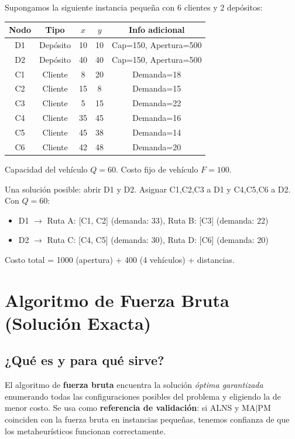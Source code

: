 \documentclass[12pt,a4paper]{article}
\begin{document}
\begin{ejemplo}
Supongamos la siguiente instancia pequeña con 6 clientes y 2 depósitos:

\begin{center}
\begin{tabular}{ccccc}
\toprule
Nodo & Tipo & $x$ & $y$ & Info adicional \\
\midrule
D1 & Depósito & 10 & 10 & Cap=150, Apertura=500 \\
D2 & Depósito & 40 & 40 & Cap=150, Apertura=500 \\
C1 & Cliente  &  8 & 20 & Demanda=18 \\
C2 & Cliente  & 15 &  8 & Demanda=15 \\
C3 & Cliente  &  5 & 15 & Demanda=22 \\
C4 & Cliente  & 35 & 45 & Demanda=16 \\
C5 & Cliente  & 45 & 38 & Demanda=14 \\
C6 & Cliente  & 42 & 48 & Demanda=20 \\
\bottomrule
\end{tabular}
\end{center}

Capacidad del vehículo $Q = 60$. Costo fijo de vehículo $F = 100$.

Una solución posible: abrir D1 y D2. Asignar C1,C2,C3 a D1 y C4,C5,C6 a D2. Con $Q=60$:
\begin{itemize}
\item D1 $\to$ Ruta A: [C1, C2] (demanda: 33), Ruta B: [C3] (demanda: 22)
\item D2 $\to$ Ruta C: [C4, C5] (demanda: 30), Ruta D: [C6] (demanda: 20)
\end{itemize}
Costo total = 1000 (apertura) + 400 (4 vehículos) + distancias.
\end{ejemplo}

\section{Algoritmo de Fuerza Bruta (Solución Exacta)}

\subsection{¿Qué es y para qué sirve?}

El algoritmo de \textbf{fuerza bruta} encuentra la solución \emph{óptima garantizada} enumerando todas las configuraciones posibles del problema y eligiendo la de menor costo. Se usa como \textbf{referencia de validación}: si ALNS y MA$|$PM coinciden con la fuerza bruta en instancias pequeñas, tenemos confianza de que los metaheurísticos funcionan correctamente.
\end{document}
